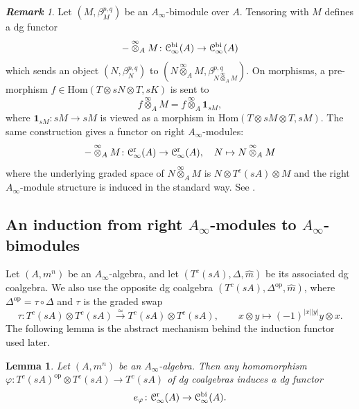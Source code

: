 \documentclass[a4paper, 11pt]{amsart}
\newtheorem{lem}[thm]{Lemma}
\theoremstyle{definition}
\theoremstyle{remark}
\newtheorem{rem}[thm]{\bf Remark}
\numberwithin{equation}{section}
\newcommand{\RR}{\mathrm{r}}
\newcommand{\BB}{\mathrm{bi}}
\newcommand{\Hom}{\mathrm{Hom}}
\newcommand{\op}{\mathrm{op}}
\newcommand{\EC}{\EuScript{C}}
\begin{document}
\begin{rem}\label{rem:tensorfunctor}
Let $(M,\beta_M^{p,q})$ be an $A_\infty$-bimodule over $A$. Tensoring with $M$ defines a dg functor
\[
- \overset{\infty}\otimes_A M \colon \EC^{\BB}_\infty(A) \to \EC^{\BB}_\infty(A)
\]
which sends an object $(N,\beta_N^{p,q})$ to $(N\overset{\infty}\otimes_A M,\beta_{N\overset{\infty}\otimes_A M}^{p,q})$.
On morphisms, a pre-morphism $f\in \Hom(T\otimes sN\otimes T,sK)$ is sent to
\[
f\overset{\infty}\otimes_A M=f\overset{\infty}\otimes_A \mathbf 1_{sM},
\]
where $\mathbf 1_{sM}\colon sM\to sM$ is viewed as a morphism in $\Hom(T\otimes sM\otimes T,sM)$.
The same construction gives a functor on right $A_\infty$-modules:
\[
 - \overset{\infty}\otimes_A M \colon \EC^{\RR}_\infty(A) \to \EC^{\RR}_\infty(A) , \quad N \mapsto N \overset{\infty}\otimes_A M
\]
where the underlying graded space of $N\overset{\infty}\otimes_A M$ is $N\otimes T^c(sA)\otimes M$ and the right $A_\infty$-module structure is induced in the standard way. See \cite[Subsection 6.3]{Kel01}.
\end{rem}


\subsection{An induction from right $A_\infty$-modules to $A_\infty$-bimodules}
Let $(A,m^n)$ be an $A_\infty$-algebra, and let $(T^c(sA),\Delta,\widehat m)$ be its associated dg coalgebra. We also use the opposite dg coalgebra $(T^c(sA),\Delta^{\op},\widehat m)$, where $\Delta^{\op}=\tau\circ\Delta$ and $\tau$ is the graded swap
\[
\tau\colon T^c(sA)\otimes T^c(sA)\xrightarrow{\simeq} T^c(sA)\otimes T^c(sA),
\qquad
x\otimes y\mapsto (-1)^{|x||y|}y\otimes x.
\]
The following lemma is the abstract mechanism behind the induction functor used later.


\begin{lem}\label{lem:bi-rightduality}
Let $(A, m^n)$ be an $A_{\infty}$-algebra.
Then any homomorphism $\varphi\colon T^c(sA)^{\op}\otimes T^c(sA)\to T^c(sA)$ of dg coalgebras induces a dg functor
\[
 e_{\varphi}\colon \EC^{\RR}_\infty(A) \to \EC^{\BB}_\infty(A).
\]
\end{lem}
\end{document}
